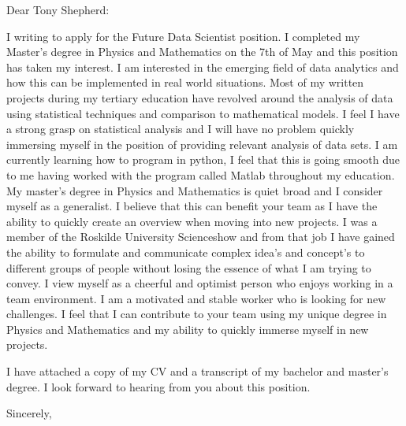 \documentclass[10pt,a4paper]{letter}
\begin{document}
\begin{letter}{}
\opening{Dear Tony Shepherd:}

I writing to apply for the Future Data Scientist position. I completed my Master's degree in Physics and Mathematics on the 7th of May and this position has taken my interest. I am interested in the emerging field of data analytics and how this can be implemented in real world situations. Most of my written projects during my tertiary education have revolved around the analysis of data using statistical techniques and comparison to mathematical models. I feel I have a strong grasp on statistical analysis and I will have no problem quickly immersing myself in the position of providing relevant analysis of data sets. I am currently learning how to program in python, I feel that this is going smooth due to me having worked with the program called Matlab throughout my education. My master's degree in Physics and Mathematics is quiet broad and I consider myself as a generalist. I believe that this can benefit your team as I have the ability to quickly create an overview when moving into new projects. I was a member of the Roskilde University Scienceshow and from that job I have gained the ability to formulate and communicate complex idea's and concept's to different groups of people without losing the essence of what I am trying to convey.  I view myself as a cheerful and optimist person who enjoys working in a team environment. I am a motivated and stable worker who is looking for new challenges. I feel that I can contribute to your team using my unique degree in Physics and Mathematics and my ability to quickly immerse myself in new projects. 

I have attached a copy of my CV and a transcript of my bachelor and master's degree. I look forward to hearing from you about this position.   

\closing{Sincerely,}

\end{letter}

\end{document}
